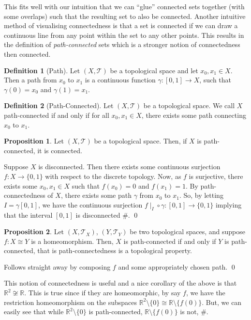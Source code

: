 \documentclass[
]{article}
\theoremstyle{definition}
\newtheorem{prop}{Proposition}
\theoremstyle{definition}
\newtheorem{definition}{Definition}[section]
\begin{document}
This fits well with our intuition that we can ``glue'' connected sets
together (with some overlaps) such that the resulting set to also be
connected. Another intuitive method of visualising connectedness is that
a set is connected if we can draw a continuous line from any point
within the set to any other points. This results in the definition of
\emph{path-connected} sets which is a stronger notion of connectedness
then connected.

\begin{definition}[Path]
  Let \((X, \mathcal{T})\) be a topological space and let \(x_0, x_1 \in X\). 
  Then a path from \(x_0\) to \(x_1\) is a continuous function 
  \(\gamma : [0, 1] \to X\), such that \(\gamma (0) = x_0\) and \(\gamma (1) = x_1\).
\end{definition}

\begin{definition}[Path-Connected]
  Let \((X, \mathcal{T})\) be a topological space. We call \(X\) path-connected 
  if and only if for all \(x_0, x_1 \in X\), there exists some path connecting 
  \(x_0\) to \(x_1\).
\end{definition}

\begin{prop}
  Let \((X, \mathcal{T})\) be a topological space. Then, if \(X\) is path-connected, 
  it is connected.
\end{prop}
\proof

Suppose \(X\) is disconnected. Then there exists some continuous
surjection \(f : X \to \{0, 1\}\) with respect to the discrete topology.
Now, as \(f\) is surjective, there exists some \(x_0, x_1 \in X\) such
that \(f(x_0) = 0\) and \(f(x_1) = 1\). By path-connectedness of \(X\),
there exists some path \(\gamma\) from \(x_0\) to \(x_1\). So, by
letting \(I = \gamma[0, 1]\), we have the continuous surjection
\(f \mid_I \circ \gamma : [0, 1] \to \{0, 1\}\) implying that the
interval \([0, 1]\) is disconnected \#. \qed

\begin{prop}
  Let \((X, \mathcal{T}_X)\), \((Y, \mathcal{T}_Y)\) be two topological spaces, 
  and suppose \(f : X \cong Y\) is a homeomorphism. Then, \(X\) is path-connected 
  if and only if \(Y\) is path-connected, that is path-connectedness is a 
  topological property.
\end{prop}
\proof

Follows straight away by composing \(f\) and some appropriately chosen
path. \qed

This notion of connectedness is useful and a nice corollary of the above
is that \(\mathbb{R}^2 \not\cong \mathbb{R}\). This is true since if
they are homeomorphic, by say \(f\), we have the restriction
homeomorphism on the subspaces
\(\mathbb{R}^2 \setminus \{0\} \cong \mathbb{R} \setminus \{f(0)\}\).
But, we can easily see that while \(\mathbb{R}^2 \setminus \{0\}\) is
path-connected, \(\mathbb{R} \setminus \{f(0)\}\) is not, \#.
\end{document}
